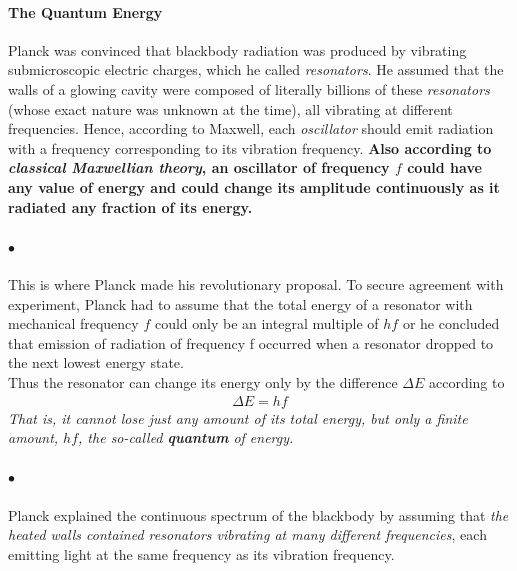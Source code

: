 \documentclass[a4paper]{report}
\begin{document}
            \paragraph{\color{c3}The Quantum Energy}
            Planck was convinced that blackbody radiation was produced by vibrating submicroscopic 
            electric charges, which he called \textit{resonators}. He assumed that the walls of a glowing 
            cavity were composed of literally billions of these \textit{resonators} (whose exact nature was 
            unknown at the time), all vibrating at different frequencies. Hence, according to Maxwell, 
            each \textit{oscillator} should emit radiation with a frequency corresponding to its vibration 
            frequency. \textbf{Also according to \textit{classical Maxwellian theory}, an oscillator of frequency $f$ 
            could have \textbf{any} value of energy and could change its amplitude continuously as it 
            radiated any fraction of its energy.}

            \paragraph{$\bullet$} This is where Planck made his revolutionary proposal. 
            To secure agreement with experiment, Planck had to assume that the total energy of a 
            resonator with mechanical frequency $f$ could only be an integral multiple of $hf$ or
            he concluded that emission of radiation of frequency f occurred when a resonator dropped 
            to the next lowest energy state.\\
            Thus the resonator can change its energy only by the difference $\Delta{E}$ according to
            \begin{align} \label{eq:energy change of hf}
                \Delta{E} = hf
            \end{align}
            \textit{That is, it cannot lose just any amount of its total energy, but only a finite amount, $hf$, 
            the so-called \textbf{quantum} of energy.}
            
            \paragraph{$\bullet$} Planck explained the continuous spectrum of the blackbody by assuming 
            that \textit{the heated walls contained resonators vibrating at many different frequencies}, each 
            emitting light at the same frequency as its vibration frequency.
\end{document}
